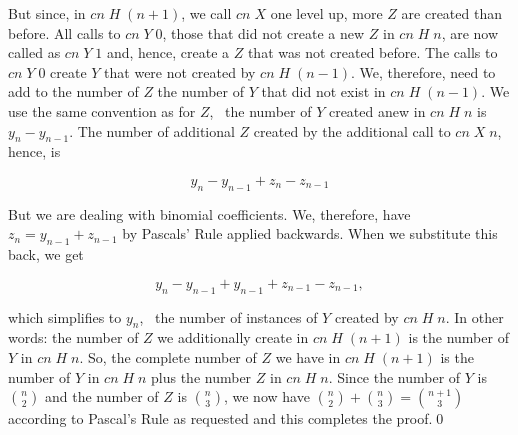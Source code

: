 \documentclass[tikz]{scrreprt}
\newcommand{\Conid}[1]{\mathit{#1}}
\newcommand{\Varid}[1]{\mathit{#1}}
\begin{document}
But since, in \ensuremath{\Varid{cn}\;\Conid{H}\;(\Varid{n}\mathbin{+}\mathrm{1})}, we call \ensuremath{\Varid{cn}\;\Conid{X}} one level up,
more \ensuremath{\Conid{Z}} are created than before.
All calls to \ensuremath{\Varid{cn}\;\Conid{Y}\;\mathrm{0}}, those that did not create a new \ensuremath{\Conid{Z}}
in \ensuremath{\Varid{cn}\;\Conid{H}\;\Varid{n}},
are now called as \ensuremath{\Varid{cn}\;\Conid{Y}\;\mathrm{1}} and, hence, create a \ensuremath{\Conid{Z}}
that was not created before. The calls to \ensuremath{\Varid{cn}\;\Conid{Y}\;\mathrm{0}} create
\ensuremath{\Conid{Y}} that were not created by \ensuremath{\Varid{cn}\;\Conid{H}\;(\Varid{n}\mathbin{-}\mathrm{1})}.
We, therefore, need to add to the number of \ensuremath{\Conid{Z}} the number
of \ensuremath{\Conid{Y}} that did not exist in \ensuremath{\Varid{cn}\;\Conid{H}\;(\Varid{n}\mathbin{-}\mathrm{1})}.
We use the same convention as for \ensuremath{\Conid{Z}}, \ie\
the  number of \ensuremath{\Conid{Y}} created anew in \ensuremath{\Varid{cn}\;\Conid{H}\;\Varid{n}} is
$y_n - y_{n-1}$.
The number of additional \ensuremath{\Conid{Z}} 
created by the additional call to 
\ensuremath{\Varid{cn}\;\Conid{X}\;\Varid{n}}, hence, is

\[
y_n - y_{n-1} + z_n - z_{n-1}
\]

But we are dealing with binomial coefficients.
We, therefore, have $z_n = y_{n-1} + z_{n-1}$
by Pascals' Rule applied backwards.
When we substitute this back, we get

\[
y_n - y_{n-1} + y_{n-1} + z_{n-1} - z_{n-1},
\]

which simplifies to $y_n$, \ie\ the number of 
instances of \ensuremath{\Conid{Y}} created by \ensuremath{\Varid{cn}\;\Conid{H}\;\Varid{n}}.
In other words: the number of \ensuremath{\Conid{Z}} we 
additionally create in \ensuremath{\Varid{cn}\;\Conid{H}\;(\Varid{n}\mathbin{+}\mathrm{1})} is the number
of \ensuremath{\Conid{Y}} in \ensuremath{\Varid{cn}\;\Conid{H}\;\Varid{n}}.
So, the complete number of \ensuremath{\Conid{Z}} we have 
in \ensuremath{\Varid{cn}\;\Conid{H}\;(\Varid{n}\mathbin{+}\mathrm{1})} is
the number of \ensuremath{\Conid{Y}} in \ensuremath{\Varid{cn}\;\Conid{H}\;\Varid{n}} 
plus the number \ensuremath{\Conid{Z}} in \ensuremath{\Varid{cn}\;\Conid{H}\;\Varid{n}}.
Since the number of \ensuremath{\Conid{Y}} is $\binom{n}{2}$
and the number of \ensuremath{\Conid{Z}} is  $\binom{n}{3}$,
we now have 
$\binom{n}{2} + \binom{n}{3} = \binom{n+1}{3}$ 
according to Pascal's Rule as requested
and this completes the proof.\qed
\end{document}
